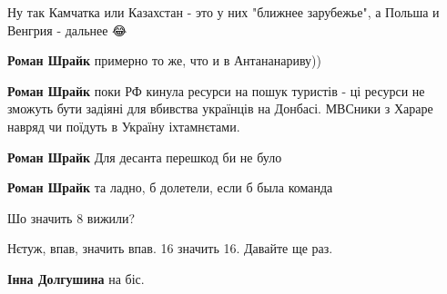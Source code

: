 \begin{itemize}
\begin{itemize}
Ну так Камчатка или Казахстан - это у них "ближнее зарубежье", а Польша и Венгрия - дальнее 😂

 
\textbf{Роман Шрайк} примерно то же, что и в Антананариву))

 
\textbf{Роман Шрайк} поки РФ кинула ресурси на пошук туристів - ці ресурси не зможуть бути задіяні для вбивства українців на Донбасі.
МВСники з Хараре навряд чи поїдуть в Україну іхтамнєтами.

 
\textbf{Роман Шрайк} Для десанта перешкод би не було

 
\textbf{Роман Шрайк} та ладно, б долетели, если б была команда

\end{itemize}

 
Шо значить 8 вижили?

Нєтуж, впав, значить впав. 16 значить 16. Давайте ще раз.

\begin{itemize}
 
\textbf{Інна Долгушина} на біс.


\end{itemize}
\end{itemize}
